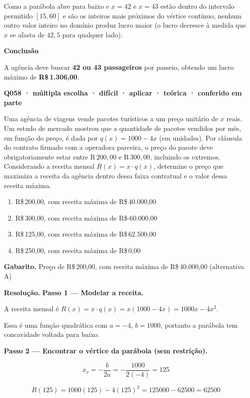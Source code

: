 \documentclass[11pt,a4paper]{article}
\begin{document}
Como a parábola abre para baixo e $x=42$ e $x=43$ estão dentro do intervalo permitido $[15,60]$ e são os inteiros mais próximos do vértice contínuo, nenhum outro valor inteiro no domínio produz lucro maior (o lucro decresce à medida que $x$ se afasta de $42{,}5$ para qualquer lado).

\textbf{Conclusão}

A agência deve buscar \textbf{42 ou 43 passageiros} por passeio, obtendo um lucro máximo de \textbf{R\$\,1.306,00}.

\bigskip\noindent\textbf{Q058 · múltipla escolha · difícil · aplicar · teórica · conferido em parte}\par\nopagebreak
Uma agência de viagens vende pacotes turísticos a um preço unitário de $x$ reais. Um estudo de mercado mostrou que a quantidade de pacotes vendidos por mês, em função do preço, é dada por $q(x) = 1000 - 4x$ (em unidades). Por cláusula do contrato firmado com a operadora parceira, o preço do pacote deve obrigatoriamente estar entre R$\,200,00$ e R$\,300,00$, incluindo os extremos. Considerando a receita mensal $R(x) = x \cdot q(x)$, determine o preço que maximiza a receita da agência dentro dessa faixa contratual e o valor dessa receita máxima.
\begin{enumerate}[label=(\alph*)]
\item R\$\,200,00, com receita máxima de R\$\,40.000,00
\item R\$\,300,00, com receita máxima de R\$-60.000,00
\item R\$\,125,00, com receita máxima de R\$\,62.500,00
\item R\$\,250,00, com receita máxima de R\$\,0,00
\end{enumerate}

\textbf{Gabarito.} Preço de R\$\,200,00, com receita máxima de R\$\,40.000,00 (alternativa A)

\textbf{Resolução.} \textbf{Passo 1 — Modelar a receita.}

A receita mensal é $R(x) = x \cdot q(x) = x(1000 - 4x) = 1000x - 4x^2$.

Essa é uma função quadrática com $a = -4$, $b = 1000$, portanto a parábola tem concavidade voltada para baixo.

\textbf{Passo 2 — Encontrar o vértice da parábola (sem restrição).}

$$x_v = -\dfrac{b}{2a} = -\dfrac{1000}{2(-4)} = 125$$

$$R(125) = 1000(125) - 4(125)^2 = 125000 - 62500 = 62500$$
\end{document}

